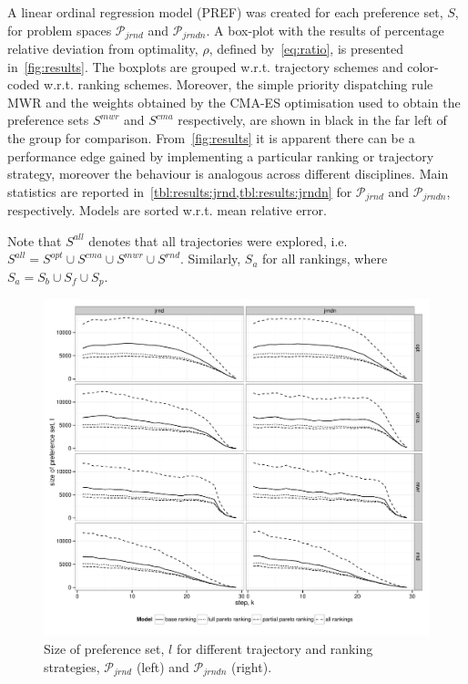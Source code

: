\documentclass[letterpaper]{article}
\begin{document}
A linear ordinal regression model (PREF) was created for each preference set, $S$, for problem spaces $\mathcal{P}_{jrnd}$ and $\mathcal{P}_{jrndn}$. A box-plot with the results of percentage relative deviation from optimality, $\rho$, defined by~\cref{eq:ratio}, is presented in~\cref{fig:results}. The boxplots are grouped w.r.t. trajectory schemes and color-coded w.r.t. ranking schemes. 
Moreover, the simple priority dispatching rule MWR and the weights obtained by the CMA-ES optimisation used to obtain the preference sets $S^{mwr}$ and $S^{cma}$ respectively, are shown in black in the far left of the group for comparison.
From~\cref{fig:results} it is apparent there can be a performance edge gained by implementing a particular ranking or trajectory strategy, moreover the behaviour is analogous across different disciplines. 
Main statistics are reported in~\cref{tbl:results:jrnd,tbl:results:jrndn} for $\mathcal{P}_{jrnd}$ and $\mathcal{P}_{jrndn}$, respectively. Models are sorted w.r.t. mean relative error.

Note that $S^{all}$ denotes that all trajectories were explored, i.e. $S^{all}=S^{opt}\cup S^{cma}\cup S^{mwr} \cup S^{rnd}$.
Similarly, $S_{a}$ for all rankings, where $S_a=S_b\cup S_f\cup S_p$.

\begin{figure} \centering
\includegraphics[width=\columnwidth]{figures/numTrainingData}
\caption{Size of preference set, $l$ for different trajectory and ranking strategies, $\mathcal{P}_{jrnd}$ (left) and $\mathcal{P}_{jrndn}$ (right).}
\label{fig:sizeofprefset}
\end{figure}
\end{document}
